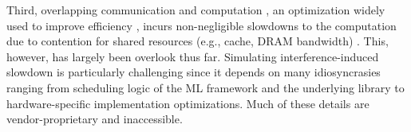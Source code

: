{Third}, overlapping communication and computation \ops, an optimization widely used to improve efficiency \cite{chang2024flux, jiang2024megascale,chen2024centauri,zhang2017poseidon}, incurs non-negligible slowdowns to the computation due to contention for shared resources (e.g., cache, DRAM bandwidth) \cite{hwang2023ark,duan2024proteus}.
This, however, has largely been overlook thus far.
Simulating interference-induced slowdown is particularly challenging since it depends on many idiosyncrasies ranging from scheduling logic of the ML framework and the underlying library to hardware-specific implementation optimizations.
Much of these details are vendor-proprietary and inaccessible. 




